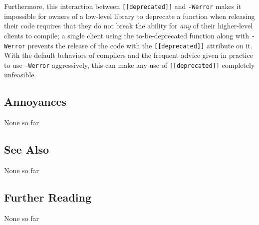 Furthermore, this interaction between \texttt{[[deprecated]]} and
\texttt{-Werror} makes it impossible for owners of a low-level library
to deprecate a function when releasing their code requires that they do
not break the ability for \textit{any} of their higher-level clients to compile;
a single client using the to-be-deprecated function along with
\texttt{-Werror} prevents the release of the code with the
\texttt{[[deprecated]]} attribute on it. With the default behaviors of
compilers and the frequent advice given in practice to use
\texttt{-Werror} aggressively, this can make any use of
\texttt{[[deprecated]]} completely unfeasible.

\subsection[Annoyances]{Annoyances}\label{annoyances}

None so far

\subsection[See Also]{See Also}\label{see-also}

None so far

\subsection[Further Reading]{Further Reading}\label{further-reading}

None so far



